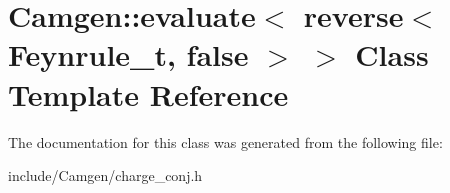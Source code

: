 \hypertarget{a00181}{}\section{Camgen\+:\+:evaluate$<$ reverse$<$ Feynrule\+\_\+t, false $>$ $>$ Class Template Reference}
\label{a00181}


The documentation for this class was generated from the following file\+:\begin{DoxyCompactItemize}
\item 
include/\+Camgen/charge\+\_\+conj.\+h\end{DoxyCompactItemize}
